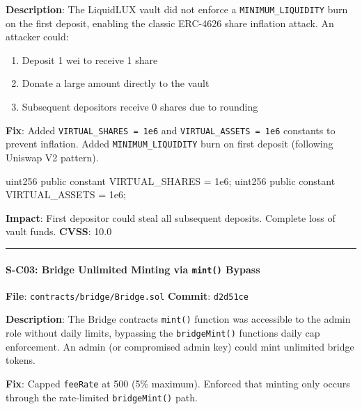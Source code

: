 \documentclass[
]{article}
\newenvironment{Shaded}{}{}
\newcommand{\NormalTok}[1]{#1}
\providecommand{\tightlist}{%
  \setlength{\itemsep}{0pt}\setlength{\parskip}{0pt}}
\begin{document}
\textbf{Description}: The LiquidLUX vault did not enforce a
\texttt{MINIMUM\_LIQUIDITY} burn on the first deposit, enabling the
classic ERC-4626 share inflation attack. An attacker could:

\begin{enumerate}
\def\labelenumi{\arabic{enumi}.}
\tightlist
\item
  Deposit 1 wei to receive 1 share
\item
  Donate a large amount directly to the vault
\item
  Subsequent depositors receive 0 shares due to rounding
\end{enumerate}

\textbf{Fix}: Added \texttt{VIRTUAL\_SHARES\ =\ 1e6} and
\texttt{VIRTUAL\_ASSETS\ =\ 1e6} constants to prevent inflation. Added
\texttt{MINIMUM\_LIQUIDITY} burn on first deposit (following Uniswap V2
pattern).

\begin{Shaded}
\begin{Highlighting}[]
\NormalTok{uint256 public constant VIRTUAL\_SHARES = 1e6;}
\NormalTok{uint256 public constant VIRTUAL\_ASSETS = 1e6;}
\end{Highlighting}
\end{Shaded}

\textbf{Impact}: First depositor could steal all subsequent deposits.
Complete loss of vault funds. \textbf{CVSS}: 10.0

\begin{center}\rule{0.5\linewidth}{0.5pt}\end{center}

\paragraph{\texorpdfstring{S-C03: Bridge Unlimited Minting via
\texttt{mint()}
Bypass}{S-C03: Bridge Unlimited Minting via mint() Bypass}}\label{s-c03-bridge-unlimited-minting-via-mint-bypass}

\textbf{File}: \texttt{contracts/bridge/Bridge.sol} \textbf{Commit}:
\texttt{d2d51ce}

\textbf{Description}: The Bridge contract\textquotesingle s
\texttt{mint()} function was accessible to the admin role without daily
limits, bypassing the \texttt{bridgeMint()} function\textquotesingle s
daily cap enforcement. An admin (or compromised admin key) could mint
unlimited bridge tokens.

\textbf{Fix}: Capped \texttt{feeRate} at 500 (5\% maximum). Enforced
that minting only occurs through the rate-limited \texttt{bridgeMint()}
path.
\end{document}
